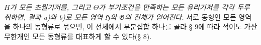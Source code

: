 
\emph{$H$가 모든 초월기저를, 그리고 $\Theta$가 부가조건을 만족하는 모든 유리기저를 각각 두루 취하면, 결과 a)와 b)로 모든 영역 $\mathfrak H$와 $\mathfrak G$의 전체가 얻어진다.} 서로 동형인 모든 영역을 하나의 동형류로 묶으면, 이 전체에서 부분집합 하나를 골라 § 9에 따라 적어도 가산무한개인 모든 동형류를 대표하게 할 수 있다(§ 8).

